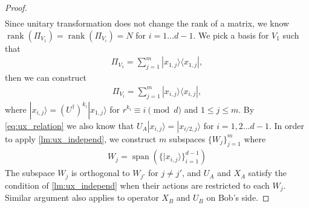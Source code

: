 \documentclass[11pt,letterpaper]{article}
\newcommand{\ket}[1]{|#1\rangle}
\newcommand{\ketbra}[2]{|#1\rangle\langle#2|}
\newcommand{\ct}{^{\dagger}}
\DeclareMathOperator{\spn}{span}
\DeclareMathOperator{\rank}{rank}
\DeclareMathOperator{\supp}{supp}
\newcommand{\1}{\mathbb{1}}
\theoremstyle{definition}
\begin{document}
\begin{proof}
\begin{align}
\end{align}
Since unitary transformation does not change the rank of a matrix, we know $\rank(\Pi_{V_1}) = \rank(\Pi_{V_{i}}) =N$
for $ i =1 \dots d-1$.
We pick a basis for $V_1$ such that 
\begin{align}
	\Pi_{V_1} =  \sum_{j=1}^m \ketbra{x_{1,j}}{x_{1,j}},
\end{align}
then we can construct 
\begin{align}
 \Pi_{V_i} = \sum_{j=1}^m \ketbra{x_{i,j}}{x_{i,j}},
\end{align}
where $\ket{x_{i,j}} = (U\ct)^{k_i} \ket{x_{1,j}}$ for $r^{k_i} \equiv i \pmod{d}$ and $1 \leq j \leq m$.
By \cref{eq:ux_relation} we also know that $U_A \ket{x_{i,j}} = \ket{x_{i/2,j}}$ for $i = 1,2 \dots d-1$.
In order to apply \cref{lm:ux_independ}, we construct $m$ subspaces $\{W_j\}_{j=1}^m$ where 
\begin{align}
	W_j = \spn( \{ \ket{x_{i,j}} \}_{i=1}^{d-1} )
\end{align}
The subspace $W_j$ is orthogonal to $W_{j'}$ for $j \neq j'$, and
$U_A$ and $X_A$ satisfy the condition of \cref{lm:ux_independ} when their actions are 
restricted to each $W_j$.
Similar argument also applies to operator $X_B$ and $U_B$ on Bob's side.




\end{proof}
\end{document}
